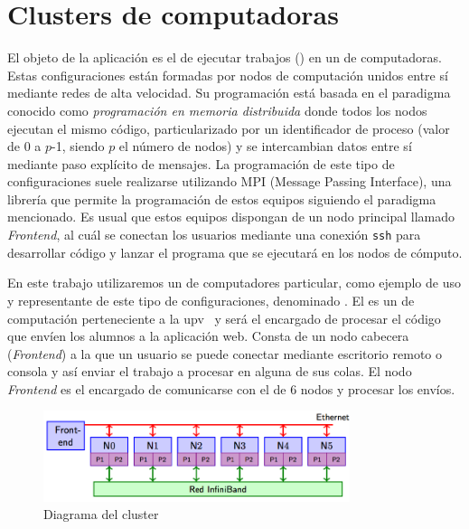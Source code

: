 \documentclass[11pt,spanish,listoffigures,listoftables]{tfgetsinf}
\begin{document}
\section{Clusters de computadoras }
El objeto de la aplicación es el de ejecutar trabajos () en un  de computadoras. Estas configuraciones están formadas por nodos de computación unidos entre sí mediante redes de alta velocidad. Su programación está basada en el paradigma conocido como \emph{programación en memoria distribuida} donde todos los nodos ejecutan el mismo código, particularizado por un identificador de proceso (valor de 0 a $p$-1, siendo $p$ el número de nodos) y se intercambian datos entre sí mediante paso explícito de mensajes. La programación de este tipo de configuraciones suele realizarse utilizando MPI (Message Passing Interface), una librería que permite la programación de estos equipos siguiendo el paradigma mencionado. Es usual que estos equipos dispongan de un nodo principal llamado \textit{Frontend}, al cuál se conectan los usuarios mediante una conexión \texttt{ssh} para desarrollar código y lanzar el programa que se ejecutará en los nodos de cómputo. 

En este trabajo utilizaremos un  de computadores particular, como ejemplo de uso y representante de este tipo de configuraciones, denominado \kahan. El  \kahan es un  de computación perteneciente a la \acrshort{upv}~\cite{link-cluster-kahan} y será el encargado de procesar el código que envíen los alumnos a la aplicación web. Consta de un nodo cabecera (\textit{Frontend}) a la que un usuario se puede conectar mediante escritorio remoto o consola y así enviar el trabajo a procesar en alguna de sus colas. El nodo \textit{Frontend} es el encargado de comunicarse con el  de 6 nodos y procesar los envíos.

\begin{figure}[!ht]
	\centering
	\includegraphics[width=0.8\textwidth]{img/kahan-cluster}
	\caption[Diagrama del cluster \kahan]{Diagrama del cluster \kahan}
	\label{figura:kahan-cluster}
\end{figure}
\end{document}
